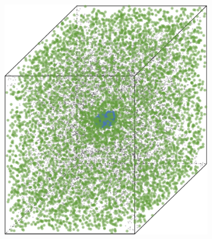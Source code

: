 	\begin{figure}
		\centering
		\begin{subfigure}{0.23\textwidth}
			\centering
			\includegraphics[keepaspectratio=true, width=\textwidth, height=0.23\textheight]{discussion/img/anisotropy_1_60000_anisotropy.png}
			\caption{\anisotropyOne}
			\label{fig:discussion:anisotropy:anisotropy1}
		\end{subfigure}
		\begin{subfigure}{0.23\textwidth}
			\centering

\end{subfigure}
\end{figure}
